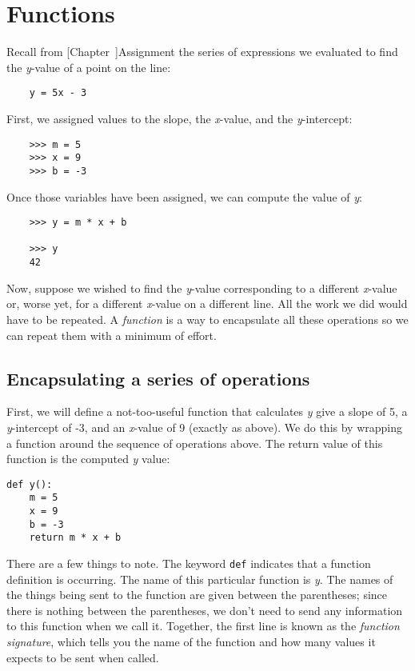 \chapter{Functions}
\label{Functions}

Recall from 
[Chapter~\Ref]{Assignment}
the series of expressions we evaluated to find
the {\it y}-value of a point on the line:

\begin{verbatim}
    y = 5x - 3
\end{verbatim}
    
First, we assigned values to the slope,
the {\it x}-value, and the {\it y}-intercept:

\begin{verbatim}
    >>> m = 5
    >>> x = 9  
    >>> b = -3
\end{verbatim}

Once those variables have been assigned,
we can compute the value of {\it y}:

\begin{verbatim}
    >>> y = m * x + b

    >>> y
    42
\end{verbatim}

Now, suppose we wished to find the {\it y}-value corresponding to
a different {\it x}-value or, worse yet, for a different {\it x}-value
on a different line. All the work we did would have to be
repeated. A {\it function} is a way to encapsulate all these operations
so we can repeat them with a minimum of effort.

\section{Encapsulating a series of operations}

First, we will define a not-too-useful function that
calculates {\it y} give a slope of 5,
a {\it y}-intercept of -3, and an
{\it x}-value of 9 (exactly
as above). We do this by wrapping a function around
the sequence of operations above.
The return value of this function is the computed {\it y} value:

\begin{verbatim}
def y():
    m = 5
    x = 9
    b = -3
    return m * x + b
\end{verbatim}

There are a few things to note. The keyword {\tt def} indicates
that a function definition is occurring. The name of this
particular function is {\it y}. The names of the things
being sent to the function are given between the parentheses;
since there is nothing between the parentheses, we don't
need to send any information to this function when we call it.
Together, the first line is known as the {\it function signature},
which tells you the name of the function and how many values
it expects to be sent when called.

